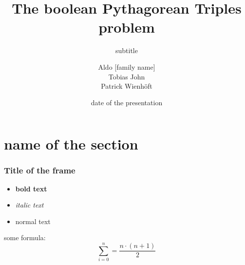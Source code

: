 \documentclass[11pt, xcolor=dvipsnames]{beamer}
\author{Aldo [family name]\\ Tobias John\\ Patrick Wienhöft}
\title{The boolean Pythagorean Triples problem}
\subtitle{subtitle}
\institute{TU Dresden}
\date{date of the presentation}
\begin{document}
	
	
	\begin{frame}
	\titlepage
\end{frame}





\section{name of the section}
\begin{frame}
\frametitle{Title of the frame}
\begin{itemize}
	\setlength{\itemsep}{+20pt} %
	\item \textbf{bold text} 
	\pause %
	\item \textit{italic text}
	\pause
	\item normal text
\end{itemize}
\end{frame}

\begin{frame}
	some formula:
	\[ \sum_{i = 0}^{n} = \frac{n \cdot (n+1)}{2} \]
	
\end{frame}
\end{document}
